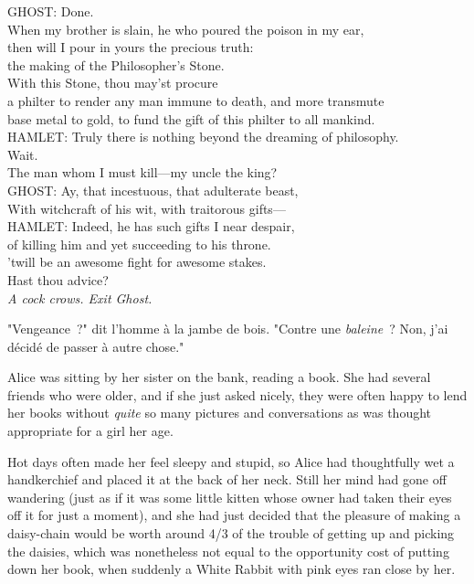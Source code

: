 \begin{playdialog}
GHOST: Done.\\
When my brother is slain, he who poured the poison in my ear,\\
then will I pour in yours the precious truth:\\
the making of the Philosopher’s Stone.\\
With this Stone, thou may’st procure\\
a philter to render any man immune to death, and more transmute\\ base metal to gold, to fund the gift of this philter to all mankind.\\

HAMLET: Truly there is nothing beyond the dreaming of philosophy.\\ Wait.\\ The man whom I must kill—my uncle the king?\\

GHOST: Ay, that incestuous, that adulterate beast,\\
With witchcraft of his wit, with traitorous gifts—\\

HAMLET: Indeed, he has such gifts I near despair,\\
of killing him and yet succeeding to his throne.\\
’twill be an awesome fight for awesome stakes.\\
Hast thou advice?\\

\emph{A cock crows. Exit Ghost.}
\end{playdialog}


"Vengeance~?" dit l'homme à la jambe de bois. "Contre une \emph{baleine}~? Non, j'ai décidé de passer à autre chose."


Alice was sitting by her sister on the bank, reading a book. She had several friends who were older, and if she just asked nicely, they were often happy to lend her books without \emph{quite} so many pictures and conversations as was thought appropriate for a girl her age.

Hot days often made her feel sleepy and stupid, so Alice had thoughtfully wet a handkerchief and placed it at the back of her neck. Still her mind had gone off wandering (just as if it was some little kitten whose owner had taken their eyes off it for just a moment), and she had just decided that the pleasure of making a daisy-chain would be worth around 4/3 of the trouble of getting up and picking the daisies, which was nonetheless not equal to the opportunity cost of putting down her book, when suddenly a White Rabbit with pink eyes ran close by her.

